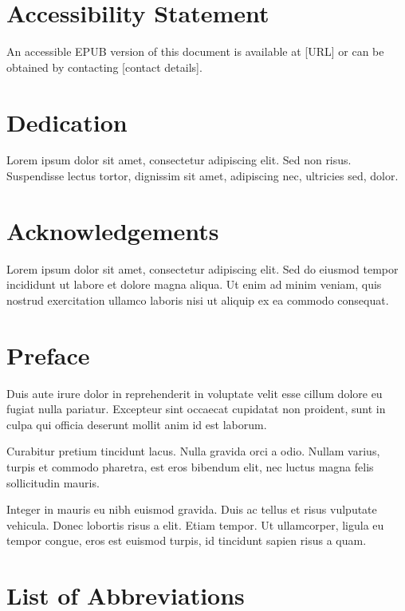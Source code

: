 \documentclass[12pt,reqno,oneside]{amsbook}
\theoremstyle{definition}
\begin{document}
\chapter*{Accessibility Statement}
\noindent
An accessible EPUB version of this document is available at [URL] or can be obtained by contacting [contact details].


\chapter*{Dedication}


Lorem ipsum dolor sit amet, consectetur adipiscing elit. Sed non risus. Suspendisse lectus tortor, dignissim sit amet, adipiscing nec, ultricies sed, dolor.

\chapter*{Acknowledgements}

Lorem ipsum dolor sit amet, consectetur adipiscing elit. Sed do eiusmod tempor incididunt ut labore et dolore magna aliqua. Ut enim ad minim veniam, quis nostrud exercitation ullamco laboris nisi ut aliquip ex ea commodo consequat.

\chapter*{Preface}

Duis aute irure dolor in reprehenderit in voluptate velit esse cillum dolore eu fugiat nulla pariatur. Excepteur sint occaecat cupidatat non proident, sunt in culpa qui officia deserunt mollit anim id est laborum.

Curabitur pretium tincidunt lacus. Nulla gravida orci a odio. Nullam varius, turpis et commodo pharetra, est eros bibendum elit, nec luctus magna felis sollicitudin mauris.

Integer in mauris eu nibh euismod gravida. Duis ac tellus et risus vulputate vehicula. Donec lobortis risus a elit. Etiam tempor. Ut ullamcorper, ligula eu tempor congue, eros est euismod turpis, id tincidunt sapien risus a quam.

\tableofcontents
\listoffigures
\listoftables

\chapter*{List of Abbreviations}
\end{document}
